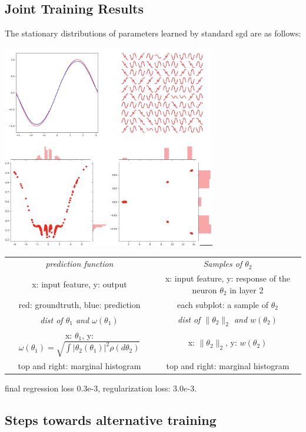 \documentclass{article}
\begin{document}
\subsection{Joint Training Results}

The stationary distributions of parameters learned by standard sgd are as follows:

\includegraphics[width=0.7\textwidth]{joint-optimal}

\begin{center}
\begin{tabular}{ |c|c| } 
 \hline
 \emph{prediction function}         & \emph{Samples of $\theta_2$} \\ 
 x: input feature, y: output        & x: input feature, y: response of the neuron $\theta_2$ in layer 2\\ 
 red: groundtruth, blue: prediction & each subplot: a sample of $\theta_2$\\ 
 \hline
 \emph{dist of $\theta_1$ and $\omega(\theta_1)$}                                & \emph{dist of $\|\theta_2\|_2$ and $w(\theta_2)$} \\ 
 x: $\theta_1$, y: $\omega(\theta_1)=\sqrt{\int |\theta_2(\theta_1)|^2 \rho(d\theta_2)}$  & x: $\|\theta_2\|_2$, y: $w(\theta_2)$\\ 
 top and right: marginal histogram                                               & top and right: marginal histogram \\ 
 \hline
\end{tabular}
\end{center}


final regression loss $0.3$e-$3$, regularization loss: $3.0e$-$3$.

\subsection{Steps towards alternative training}
\end{document}
